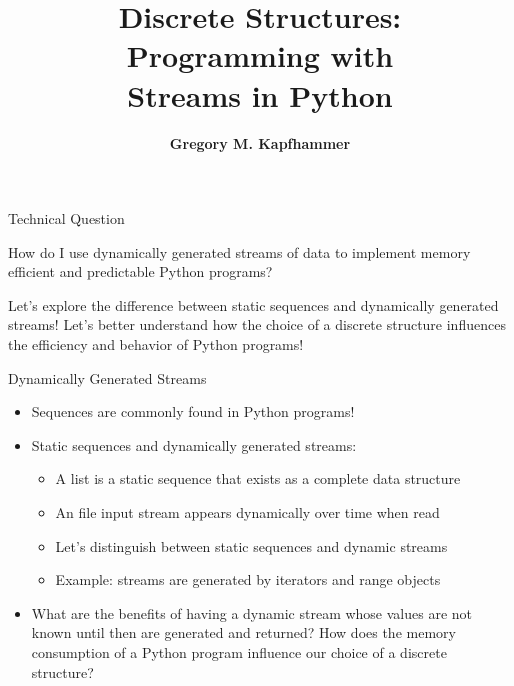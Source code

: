 \documentclass[14pt,aspectratio=169]{beamer}
\title{Discrete Structures: \\ Programming with \\ Streams in Python}
\author{{\bf Gregory M. Kapfhammer}}
\institute[shortinst]{{\bf Department of Computer Science, Allegheny College}}
\begin{document}
{
  \begin{frame}
    \titlepage
  \end{frame}
}

%
\begin{frame}{Technical Question}
  \hspace*{.25in}
  \begin{minipage}{4.8in}
    \vspace*{.1in}
    \begin{center}
      {\large How do I use dynamically generated streams of data to implement
      memory efficient and predictable Python programs?}
    \end{center}
  \end{minipage}
  \vspace{2ex}
  \begin{center}
    \small Let's explore the difference between static sequences and dynamically
    generated streams! Let's better understand how the choice of a discrete
    structure influences the efficiency and behavior of Python programs!
  \end{center}
\end{frame}

%
\begin{frame}{Dynamically Generated Streams}
  \begin{itemize}
    \item Sequences are commonly found in Python programs!
      \vspace*{-.15in}
    \item Static sequences and dynamically generated streams:
      \begin{itemize}
        \item A list is a static sequence that exists as a complete data
          structure
        \item An file input stream appears dynamically over time when read
        \item Let's distinguish between static sequences and dynamic streams
        \item Example: streams are generated by iterators and range objects
      \end{itemize}
      \vspace*{-.2in}
    \item What are the benefits of having a dynamic stream whose values are not
      known until then are generated and returned? How does the memory
      consumption of a Python program influence our choice of a discrete
      structure?
  \end{itemize}
\end{frame}
\end{document}
